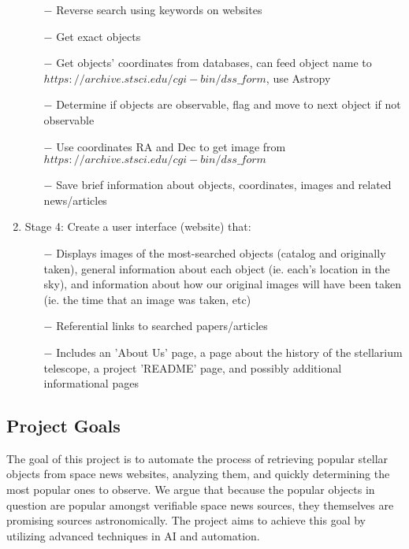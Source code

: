 \documentclass[12pt,letterpaper]{article}
\begin{document}
\begin{enumerate}[leftmargin=*]
    \begin{enumerate}
        \item [$-$] Reverse search using keywords on websites
        \item [$-$] Get exact objects
        \item [$-$] Get objects' coordinates from databases, can feed object name to $https://archive.stsci.edu/cgi-bin/dss\_form$, use Astropy
        \item [$-$] Determine if objects are observable, flag and move to next object if not observable
        \item [$-$] Use coordinates RA and Dec to get image from $https://archive.stsci.edu/cgi-bin/dss\_form$
        \item [$-$] Save brief information about objects, coordinates, images and related news/articles
    \end{enumerate}
    \item Stage 4: Create a user interface (website) that:
    \begin{enumerate}
        \item [$-$] Displays images of the most-searched objects (catalog and originally taken),
        general information about each object (ie. each's location in the sky), and information about
        how our original images will have been taken (ie. the time that an image was taken, etc)
        \item [$-$] Referential links to searched papers/articles
        \item [$-$] Includes an 'About Us' page, a page about the history of the stellarium telescope, a 
        project 'README' page, and possibly additional informational pages
    \end{enumerate}
\end{enumerate}

\subsection*{Project Goals}
The goal of this project is to automate the process of retrieving popular stellar objects 
from space news websites, analyzing them, and quickly determining the most popular ones to observe. 
We argue that because the popular objects in question are popular amongst verifiable space news sources, 
they themselves are promising sources astronomically. The project aims to achieve this goal by utilizing 
advanced techniques in AI and automation.\\
\end{document}
